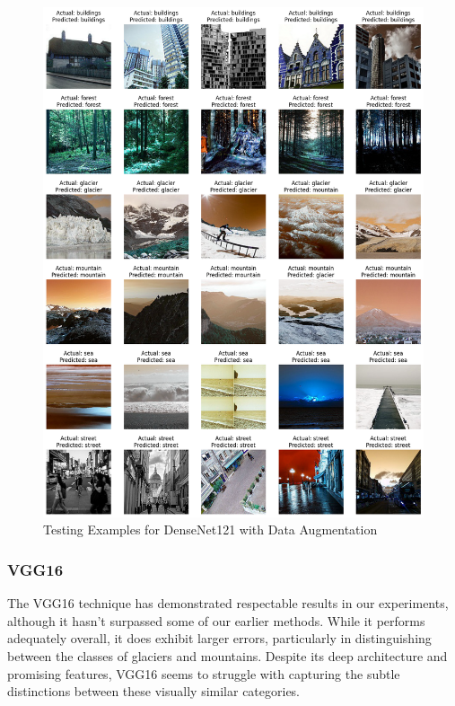 \documentclass[conference]{IEEEtran}
\begin{document}
\begin{figure}[H]
    \centering
    \includegraphics[width=1\linewidth]{images//DenseNet/Examples_DenseNet_DA.png}
    \caption{Testing Examples for DenseNet121 with Data Augmentation}
    \label{fig:enter-label}
\end{figure}

\subsubsection{VGG16}

The VGG16 technique has demonstrated respectable results in our experiments, although it hasn't surpassed some of our earlier methods. While it performs adequately overall, it does exhibit larger errors, particularly in distinguishing between the classes of glaciers and mountains. Despite its deep architecture and promising features, VGG16 seems to struggle with capturing the subtle distinctions between these visually similar categories.
\end{document}
